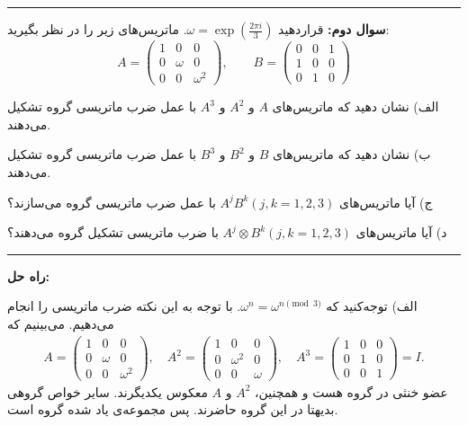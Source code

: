 \documentclass[a4paper, 12pt]{article}
\newenvironment{parind}{%
	\par%
	\medskip
	\leftskip=0mm\rightskip=7mm
	\noindent\ignorespaces}{%
	\par\medskip}
\begin{document}
\par\noindent\rule{\textwidth}{2pt}

\vspace{0.5em}
\textbf{سوال دوم:}
قراردهید 
$\omega = \exp(\frac{2\pi i}{3})$.
ماتریس‌های زیر را در نظر بگیرید:
\[
A=
\begin{pmatrix}
	1 &  0 & 0 \\ 0 & \omega & 0 \\ 0 & 0 & \omega^2
\end{pmatrix}, \qquad
B=
\begin{pmatrix}
	0 &  0 & 1 \\ 1 & 0 & 0 \\ 0 & 1 & 0
\end{pmatrix}
\] 

\hspace{7mm}
\begin{parind}
	الف) نشان دهید که ماتریس‌های 
	$A$ و $A^2$ و $A^3$
	با عمل ضرب ماتریسی گروه تشکیل 
	می‌دهند.
	
ب) نشان دهید که ماتریس‌های 
$B$ و $B^2$ و $B^3$
با عمل ضرب ماتریسی گروه تشکیل می‌دهند.

ج) آیا ماتریس‌های 
$A^jB^k (j,k=1,2,3)$
با عمل ضرب ماتریسی گروه می‌سازند؟

د) آیا ماتریس‌های 
$A^j \otimes B^k (j,k=1,2,3)$
با ضرب ماتریسی تشکیل گروه می‌دهند؟
\end{parind}


\vspace{1.5em}
\par\noindent\rule{\textwidth}{0.6pt}
\textbf{راه حل:}

الف) توجه‌کنید که 
$\omega^n = \omega^{n \pmod 3}$. با توجه به این نکته ضرب ماتریسی را انجام می‌دهیم.
می‌بینیم که
\begin{equation*}
	\begin{aligned}
		A=
		\begin{pmatrix}
			1 &  0 & 0 \\ 0 & \omega & 0 \\ 0 & 0 & \omega^2
		\end{pmatrix}, \quad A^2=
		\begin{pmatrix}
		1 &  0 & 0 \\ 0 & \omega^2 & 0 \\ 0 & 0 & \omega
		\end{pmatrix}, \quad A^3=
		\begin{pmatrix}
		1 &  0 & 0 \\ 0 & 1 & 0 \\ 0 & 0 & 1
		\end{pmatrix} = I.
	\end{aligned}
\end{equation*}
عضو خنثی‌ در گروه هست و همچنین، $A^2$ و $A$ معکوس یکدیگرند. سایر خواص گروهی بدیهتا در این گروه حاضرند. پس مجموعه‌ی یاد شده گروه است.
\end{document}

